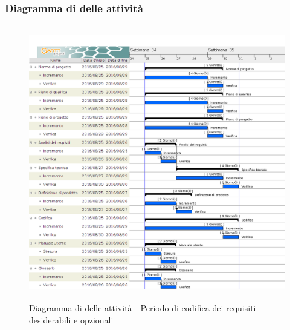 		\subsubsection{Diagramma di  delle attività}
		
		\begin{figure}[!h]
			\centering
			\includegraphics[height=12cm, width=15cm]{img/gantt/RD} 
			\caption{Diagramma di  delle attività - Periodo di codifica dei requisiti desiderabili e opzionali}
		\end{figure}
		
